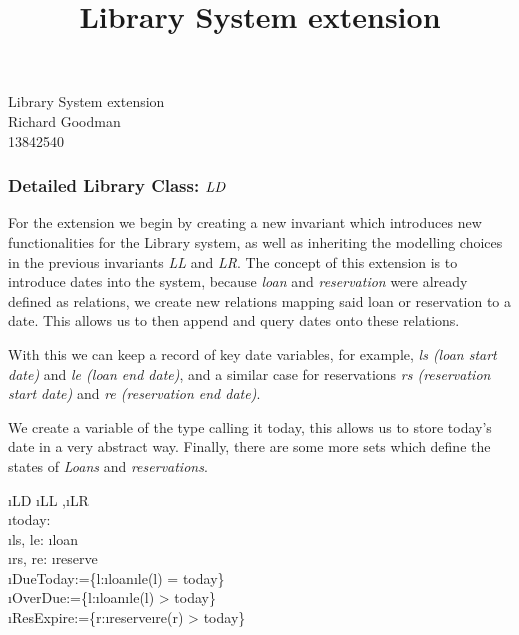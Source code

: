 \documentclass[12pt,a4paper]{article}
\title{Library System extension}
\date{}
\begin{document}
\begin{center}
{\LARGE{Library System extension}}\\
\vspace{.5cm}
{\large{Richard Goodman}}\\
\vspace{.1cm}
{13842540}
\end{center}
\vspace{.5cm}




\subsubsection*{Detailed Library Class: $\mathit{LD}$}
For the extension we begin by creating a new invariant which introduces new functionalities for the Library system, as well as inheriting the modelling choices in the previous invariants \emph{LL} and \emph{LR}. The concept of this extension is to introduce dates into the system, because \emph{loan} and \emph{reservation} were already defined as relations, we create new relations mapping said loan or reservation to a date. This allows us to then append and query dates onto these relations.

\medskip\noindent With this we can keep a record of key date variables, for example, \emph{ls (loan start date)} and \emph{le (loan end date)}, and a similar case for reservations \emph{rs (reservation start date)} and \emph{re (reservation end date)}.

\medskip\noindent We create a variable of the type  calling it today, this allows us to store today's date in a very abstract way. Finally, there are some more sets which define the states of \emph{Loans} and \emph{reservations}. 

\begin{showspecs}
	\begin{spec}{\i{LD}}
		\i{LL} \sep \i{LR}\\
		\i{today}: \\
		\i{ls, le}: \i{loan} \tfun {}\\
		\i{rs, re}: \i{reserve} \tfun {}\\
		\i{DueToday}:=\!\{l\!:\!\i{loan}\bullet\i{le}(l) = today\}\\
		\i{OverDue}:=\!\{l\!:\!\i{loan}\bullet\i{le}(l) > today\}\\
		\i{ResExpire}:=\!\{r\!:\!\i{reserve}\bullet\i{re}(r) > today\}
	\end{spec}
\end{showspecs}
		
\end{document}
